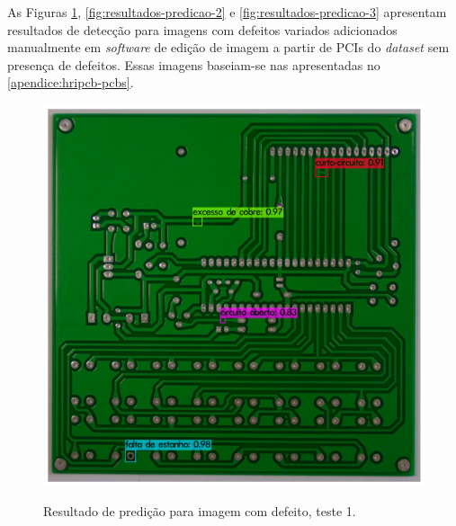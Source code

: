 As Figuras \ref{fig:resultados-predicao-1}, \ref{fig:resultados-predicao-2} e \ref{fig:resultados-predicao-3} apresentam resultados de detecção para imagens com defeitos variados adicionados manualmente em \textit{software} de edição de imagem a partir de PCIs do \textit{dataset} sem presença de defeitos.
Essas imagens baseiam-se nas apresentadas no \autoref{apendice:hripcb-pcbs}.

\begin{figure}[H] %
  \centering
  \caption{Resultado de predição para imagem com defeito, teste 1.}
  \includegraphics[scale=0.5]{img/img-resultados-predicao-1.jpg}
  \label{fig:resultados-predicao-1}
\end{figure}

